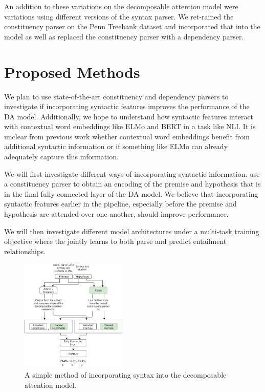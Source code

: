\documentclass[11pt,a4paper]{article}
\begin{document}
An addition to these variations on the decomposable attention model were variations using different versions of the syntax parser. We ret-rained the constituency parser on the Penn Treebank dataset and incorporated that into the model as well as replaced the constituency parser with a dependency parser. 


\section{Proposed Methods}
\label{methods}

We plan to use state-of-the-art constituency \citep{Stern2017-co} and
dependency \citep{Dozat2016-gs} parsers to investigate if incorporating
syntactic features improves the performance of the DA model. Additionally, we
hope to understand how syntactic features interact with contextual word
embeddings like ELMo \citep{Peters2018-fz} and BERT \citep{Devlin2018-qc} in a
task like NLI. It is unclear from previous work whether contextual word
embeddings benefit from additional syntactic information or if something like
ELMo can already adequately capture this information.

We will first investigate different ways of incorporating syntactic
information. \citet{Pang2018-syntail} use a constituency parser to obtain an
encoding of the premise and hypothesis that is in the final fully-connected
layer of the DA model. We believe that incorporating syntactic features earlier
in the pipeline, especially before the premise and hypothesis are attended over
one another, should improve performance.

We will then investigate different model architectures under a multi-task
training objective where the jointly learns to both parse and predict
entailment relationships.

\begin{figure}[h]
  \includegraphics[width=0.45\textwidth]{v1}
  \caption{A simple method of incorporating syntax into the decomposable
    attention model.}
\label{figure:v1}
\end{figure}
\end{document}
